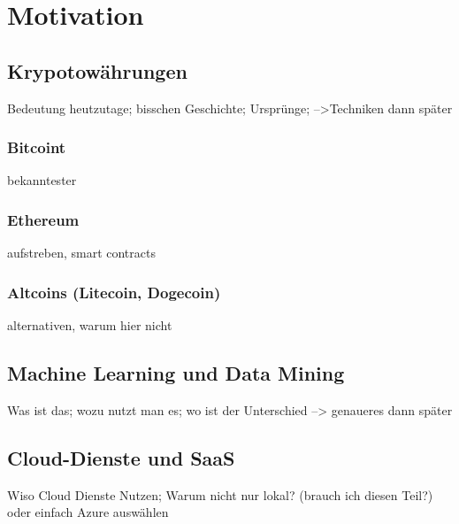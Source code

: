 \chapter{Motivation}

\section{Krypotowährungen}
Bedeutung heutzutage; bisschen Geschichte; Ursprünge; -->Techniken dann später
\subsection{Bitcoint}
bekanntester
\subsection{Ethereum}
aufstreben, smart contracts
\subsection{Altcoins (Litecoin, Dogecoin)}
alternativen, warum hier nicht
\section{Machine Learning und Data Mining}
Was ist das; wozu nutzt man es; wo ist der Unterschied --> genaueres dann später
\section{Cloud-Dienste und SaaS}
Wiso Cloud Dienste Nutzen; Warum nicht nur lokal? (brauch ich diesen Teil?) oder einfach Azure auswählen